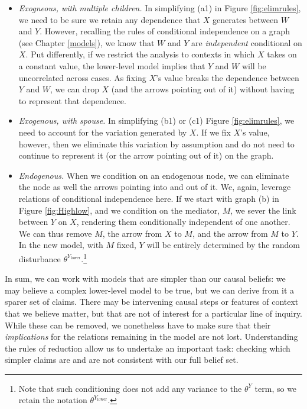 \documentclass[12pt,]{book}
\providecommand{\tightlist}{%
  \setlength{\itemsep}{0pt}\setlength{\parskip}{0pt}}
\let\rmarkdownfootnote\footnote%
\def\footnote{\protect\rmarkdownfootnote}
\begin{document}
\begin{itemize}
\tightlist
\item
  \emph{Exogneous, with multiple children.} In simplifying (a1) in Figure \ref{fig:elimrules}, we need to be sure we retain any dependence that \(X\) generates between \(W\) and \(Y\). However, recalling the rules of conditional independence on a graph (see Chapter \ref{models}), we know that \(W\) and \(Y\) are \emph{independent} conditional on \(X\). Put differently, if we restrict the analysis to contexts in which \(X\) takes on a constant value, the lower-level model implies that \(Y\) and \(W\) will be uncorrelated across cases. As fixing \(X\)'s value breaks the dependence between \(Y\) and \(W\), we can drop \(X\) (and the arrows pointing out of it) without having to represent that dependence.
\item
  \emph{Exogenous, with spouse.} In simplifying (b1) or (c1) Figure \ref{fig:elimrules}, we need to account for the variation generated by \(X\). If we fix \(X\)'s value, however, then we eliminate this variation by assumption and do not need to continue to represent it (or the arrow pointing out of it) on the graph.
\item
  \emph{Endogenous.} When we condition on an endogenous node, we can eliminate the node as well the arrows pointing into and out of it. We, again, leverage relations of conditional independence here. If we start with graph (b) in Figure \ref{fig:Highlow}, and we condition on the mediator, \(M\), we sever the link between \(Y\) on \(X\), rendering them conditionally independent of one another. We can thus remove \(M\), the arrow from \(X\) to \(M\), and the arrow from \(M\) to \(Y\). In the new model, with \(M\) fixed, \(Y\) will be entirely determined by the random disturbance \(\theta^{Y_\text{lower}}\).\footnote{Note that such conditioning does not add any variance to the \(\theta^Y\) term, so we retain the notation \(\theta^{Y_\text{lower}}\).}
\end{itemize}

In sum, we can work with models that are simpler than our causal beliefs: we may believe a complex lower-level model to be true, but we can derive from it a sparer set of claims. There may be intervening causal steps or features of context that we believe matter, but that are not of interest for a particular line of inquiry. While these can be removed, we nonetheless have to make sure that their \emph{implications} for the relations remaining in the model are not lost. Understanding the rules of reduction allow us to undertake an important task: checking which simpler claims are and are not consistent with our full belief set.
\end{document}
